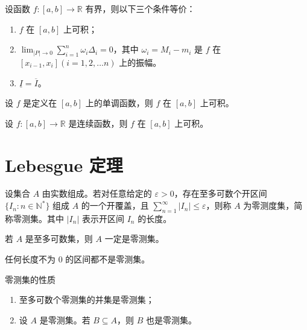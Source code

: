 \begin{theorem}
    设函数 $f:[a,b] \to \mathbb{R}$ 有界，则以下三个条件等价：
    \begin{enumerate}
        \item  $f$ 在 $[a,b]$ 上可积；
        \item $\lim_{|P| \to 0}\sum_{i = 1}^{n}\omega_i \Delta_i = 0$，其中 $\omega_i = M_i - m_i$ 是 $f$ 在 $[x_{i - 1},x_i](i = 1,2, \ldots n)$ 上的振幅。
        \item $\underline{I} = \overline{I}$。
    \end{enumerate}
\end{theorem}

\begin{theorem}
    设 $f$ 是定义在 $[a,b]$ 上的单调函数，则 $f$ 在 $[a,b]$ 上可积。
\end{theorem}

\begin{theorem}
    设 $f:[a,b] \to \mathbb{R}$ 是连续函数，则 $f$ 在 $[a,b]$ 上可积。
\end{theorem}


\section{Lebesgue 定理}

\begin{definition}
    设集合 $A$ 由实数组成。若对任意给定的 $\varepsilon > 0$，存在至多可数个开区间 $\{I_n : n \in \mathbb{N}^*\}$ 组成 $A$ 的一个开覆盖，且 $\displaystyle \sum_{n = 1}^{\infty} |I_n| \leqslant \varepsilon$，则称 $A$ 为零测度集，简称零测集。其中 $|I_n|$ 表示开区间 $I_n$ 的长度。
\end{definition}

\hfill

\begin{example}
    若 $A$ 是至多可数集，则 $A$ 一定是零测集。
\end{example}

\hfill

\begin{example}
    任何长度不为 $0$ 的区间都不是零测集。
\end{example}

\hfill

\begin{proposition}{零测集的性质}
    \begin{enumerate}
        \item 至多可数个零测集的并集是零测集；
        \item 设 $A$ 是零测集。若 $B \subseteq A$，则 $B$ 也是零测集。
    \end{enumerate}
\end{proposition}

